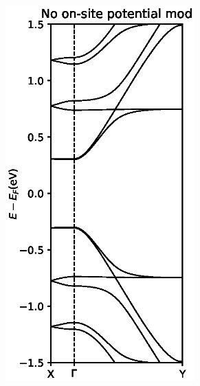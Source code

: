 \begin{figure}[ht]
\begin{subfigure}[b]{0.3\textwidth}
		\centering
		\includegraphics[width=0.8\textwidth]{Figures/PS4Onomod.eps}
		\vspace{-2\baselineskip}
		\caption{}
		\label{PS4Odevnomod}
	\end{subfigure}
	\begin{subfigure}[b]{0.3\textwidth}
		\centering

\end{subfigure}
\end{figure}
